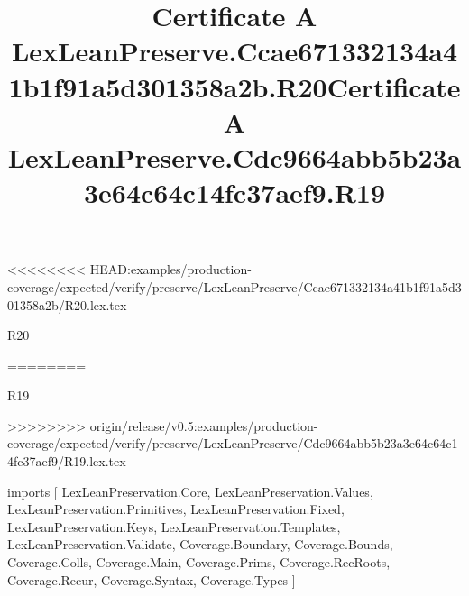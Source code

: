 <<<<<<<< HEAD:examples/production-coverage/expected/verify/preserve/LexLeanPreserve/Ccae671332134a41b1f91a5d301358a2b/R20.lex.tex
\begin{lexlean}{R20}
\title{Certificate A LexLeanPreserve.Ccae671332134a41b1f91a5d301358a2b.R20}
========
\begin{lexlean}{R19}
\title{Certificate A LexLeanPreserve.Cdc9664abb5b23a3e64c64c14fc37aef9.R19}
>>>>>>>> origin/release/v0.5:examples/production-coverage/expected/verify/preserve/LexLeanPreserve/Cdc9664abb5b23a3e64c64c14fc37aef9/R19.lex.tex
\begin{coremodule}
imports [
  LexLeanPreservation.Core,
  LexLeanPreservation.Values,
  LexLeanPreservation.Primitives,
  LexLeanPreservation.Fixed,
  LexLeanPreservation.Keys,
  LexLeanPreservation.Templates,
  LexLeanPreservation.Validate,
  Coverage.Boundary,
  Coverage.Bounds,
  Coverage.Colls,
  Coverage.Main,
  Coverage.Prims,
  Coverage.RecRoots,
  Coverage.Recur,
  Coverage.Syntax,
  Coverage.Types
]


\end{coremodule}
\end{lexlean}
\end{lexlean}
